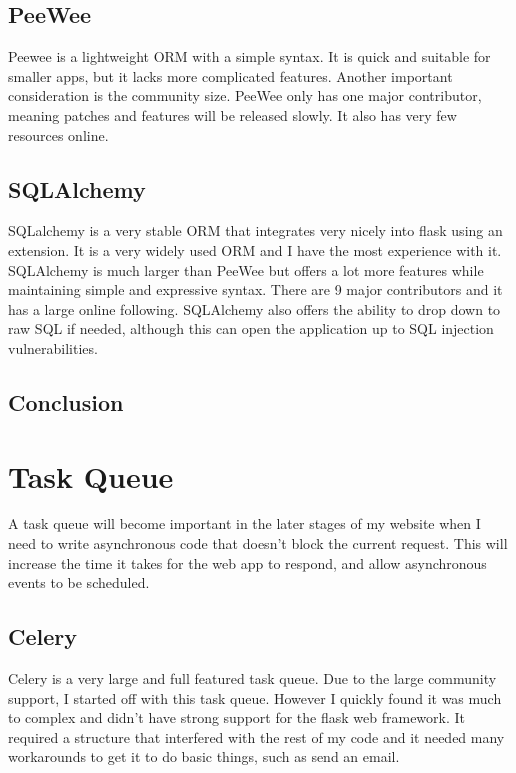 \documentclass[a4paper,oneside,12pt,draft]{report}
\begin{document}
	\subsection{PeeWee}
	Peewee is a lightweight ORM with a simple syntax. It is quick and suitable for smaller apps, but it lacks more complicated features. Another important consideration is the community size. PeeWee only has one major contributor, meaning patches and features will be released slowly. It also has very few resources online.

	\subsection{SQLAlchemy}
	SQLalchemy is a very stable ORM that integrates very nicely into flask using an extension. It is a very widely used ORM and I have the most experience with it. SQLAlchemy is much larger than PeeWee but offers a lot more features while maintaining simple and expressive syntax. There are 9 major contributors and it has a large online following. SQLAlchemy also offers the ability to drop down to raw SQL if needed, although this can open the application up to SQL injection vulnerabilities.
	
	\subsection{Conclusion}

	\section{Task Queue}
	A task queue will become important in the later stages of my website when I need to write asynchronous code that doesn't block the current request. This will increase the time it takes for the web app to respond, and allow asynchronous events to be scheduled. 

	\subsection{Celery}
	Celery is a very large and full featured task queue. Due to the large community support, I started off with this task queue.
	However I quickly found it was much to complex and didn't have strong support for the flask web framework. It required a structure that
	interfered with the rest of my code and it needed many workarounds to get it to do basic things, such as send an email.
\end{document}

